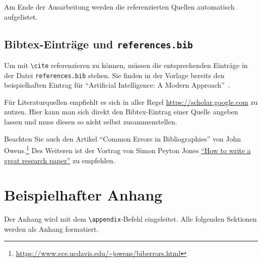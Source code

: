 \documentclass{hhuarticle}
\begin{document}
  Am Ende der Ausarbeitung werden die referenzierten Quellen automatisch
  aufgelistet.

  \subsection{Bibtex-Einträge und \texttt{references.bib}}

  Um mit \texttt{\textbackslash cite} referenzieren zu können,
  müssen die entsprechenden Einträge in der Datei \texttt{references.bib}
  stehen.
  Sie finden in der Vorlage bereits den beispielhaften Eintrag für
  ``Artificial Intelligence: A Modern Approach''~\cite{russell2002artificial}.

  Für Literaturquellen empfiehlt es sich in aller Regel
  \url{https://scholar.google.com} zu nutzen.
  Hier kann man sich direkt den Bibtex-Eintrag einer Quelle
  angeben lassen und muss diesen so nicht selbst zusammenstellen.

  Beachten Sie auch den Artikel
  ``Common Errors in Bibliographies''
  von John Owens.\footnote{%
    \url{https://www.ece.ucdavis.edu/~jowens/biberrors.html}}
  Des Weiteren ist der Vortrag von Simon Peyton Jones \href{https://www.microsoft.com/en-us/research/academic-program/write-great-research-paper/}{``How to write a great research paper''} zu empfehlen.

  \appendix
  \section{Beispielhafter Anhang}
  Der Anhang wird mit dem \texttt{\textbackslash{}appendix}-Befehl eingeleitet.
  Alle folgenden Sektionen werden als Anhang formatiert.

\backmatter
\listoffigures
\listoftables


\end{document}
